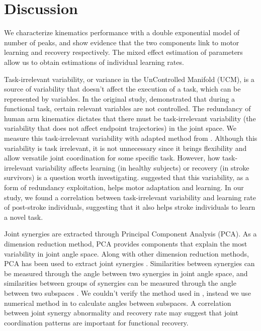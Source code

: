 \section{Discussion}
We characterize kinematics performance with a double exponential model of number of peaks, and show evidence that the two components link to motor learning and recovery respectively. 
The mixed effect estimation of parameters allow us to obtain estimations of individual learning rates.

Task-irrelevant variability, or variance in the UnControlled Manifold (UCM), is a source of variability that doesn’t affect the execution of a task, which can be represented by variables. 
In the original study, \cite{Scholz1999} demonstrated that during a functional task, certain relevant variables are not controlled.
The redundancy of human arm kinematics dictates that there must be task-irrelevant variability (the variability that does not affect endpoint trajectories) in the joint space. 
We measure this task-irrelevant variability with adapted method from \cite{Singh2016}. 
Although this variability is task irrelevant, it is not unnecessary since it brings flexibility and allow versatile joint coordination for some specific task. 
However, how task-irrelevant variability affects learning (in healthy subjects) or recovery (in stroke survivors) is a question worth investigating. 
\cite{Singh2016} suggested that this variability, as a form of redundancy exploitation, helps motor adaptation and learning. 
In our study, we found a correlation between task-irrelevant variability and learning rate of post-stroke individuals, suggesting that it also helps stroke individuals to learn a novel task.

Joint synergies are extracted through Principal Component Analysis (PCA). 
As a dimension reduction method, PCA provides components that explain the most variability in joint angle space. 
Along with other dimension reduction methods, PCA has been used to extract joint synergies \cite{Kordelaar2012}. 
Similarities between synergies can be measured through the angle between two synergies in joint angle space, and similarities between groups of synergies can be measured through the angle between two subspaces \cite{Bockemuehl2010}. 
We couldn't verify the method used in \cite{Bockemuehl2010}, instead we use numerical method in \cite{Bjoerck1973} to calculate angles between subspaces. 
A correlation between joint synergy abnormality and recovery rate may suggest that joint coordination patterns are important for functional recovery.

